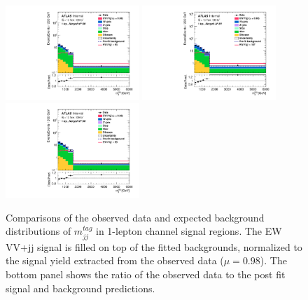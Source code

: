 \begin{figure}[]
    \centering
    \includegraphics[width=0.45\textwidth]{figures/PostFit/Region_disttagMjj_DSRVBSHP_BMin0_J0_incJet1_L1_T0_incFat1_Y6051_incTag1_Fat1_GlobalFit_unconditionnal_mu1log.pdf}
    \includegraphics[width=0.45\textwidth]{figures/PostFit/Region_disttagMjj_DSRVBSLP_BMin0_J0_incJet1_L1_T0_incFat1_Y6051_incTag1_Fat1_GlobalFit_unconditionnal_mu1log.pdf}
    \includegraphics[width=0.45\textwidth]{figures/PostFit/Region_disttagMjj_DSRVBSHP_BMin0_J0_incJet1_L1_T0_incFat1_Y6051_incTag1_Fat1_GlobalFit_unconditionnal_mu1log.pdf}
      \caption{Comparisons of the observed data and expected background distributions of $m^{tag}_{jj}$ in 1-lepton channel signal regions. The EW VV+jj signal is filled on top of the fitted backgrounds, normalized to the signal yield extracted from the observed data ($\mu = 0.98$). The bottom panel shows the ratio of the observed data to the post fit signal and background predictions.}
      \label{fig:postSR1lepmtagjj}
\end{figure}

